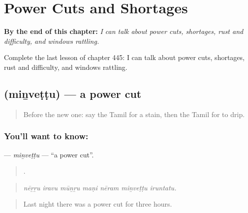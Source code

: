 
\chapter{Power Cuts and Shortages}
\label{ch:ta-power-cuts-and-shortages}

\begin{chapteropening}
\textbf{By the end of this chapter:} \emph{I can talk about power cuts, shortages, rust and difficulty, and windows rattling.}

Complete the last lesson of chapter 445: I can talk about power cuts, shortages, rust and difficulty, and windows rattling.
\end{chapteropening}

\section[\texorpdfstring{\ta{மின்வெட்டு} (miṉveṭṭu)}{மின்வெட்டு (miṉveṭṭu)}]{ (miṉveṭṭu) — a power cut}

\label{lesson:TA-C445-minvettu}



\begin{quote}
Before the new one: say the Tamil for a stain, then the Tamil for to drip.
\end{quote}

\subsection*{You'll want to know: }
\textbf{} — \emph{miṉveṭṭu} — \textquotedblleft{}a power cut\textquotedblright{}.

\begin{quote}
      .
\end{quote}

\begin{quote}
\emph{nēṟṟu iravu mūṉṟu maṇi nēram miṉveṭṭu iruntatu.}
\end{quote}

\begin{quote}
Last night there was a power cut for three hours.
\end{quote}

